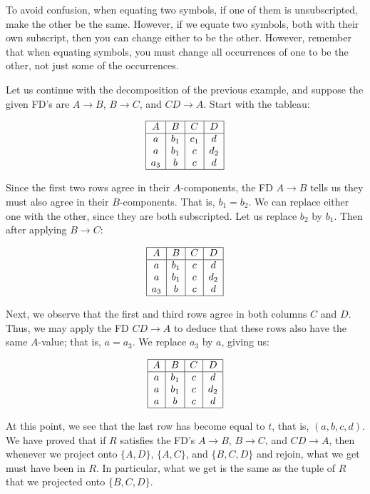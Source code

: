 \documentclass{article}
\begin{document}
    To avoid confusion, when equating two symbols, if one of them is unsubscripted, make the other be the same. However, if we equate two symbols, both with their own subscript, then you can change either to be the other. However, remember that when equating symbols, you must change all occurrences of one to be the other, not just some of the occurrences.

    \begin{example}
      Let us continue with the decomposition of the previous example, and suppose the given FD's are $A \rightarrow B$, $B \rightarrow C$, and $CD \rightarrow A$. Start with the tableau:

      \[
      \begin{array}{|c|c|c|c|}
      \hline
      A & B & C & D \\
      \hline
      a & b_1 & c_1 & d \\
      a & b_1 & c & d_2 \\
      a_3 & b & c & d \\
      \hline
      \end{array}
      \]

      Since the first two rows agree in their $A$-components, the FD $A \rightarrow B$ tells us they must also agree in their $B$-components. That is, $b_1 = b_2$. We can replace either one with the other, since they are both subscripted. Let us replace $b_2$ by $b_1$. Then after applying $B \rightarrow C$:

      \[
      \begin{array}{|c|c|c|c|}
      \hline
      A & B & C & D \\
      \hline
      a & b_1 & c & d \\
      a & b_1 & c & d_2 \\
      a_3 & b & c & d \\
      \hline
      \end{array}
      \]

      Next, we observe that the first and third rows agree in both columns $C$ and $D$. Thus, we may apply the FD $CD \rightarrow A$ to deduce that these rows also have the same $A$-value; that is, $a = a_3$. We replace $a_3$ by $a$, giving us:

      \[
      \begin{array}{|c|c|c|c|}
      \hline
      A & B & C & D \\
      \hline
      a & b_1 & c & d \\
      a & b_1 & c & d_2 \\
      a & b & c & d \\
      \hline
      \end{array}
      \]

      At this point, we see that the last row has become equal to $t$, that is, $(a,b,c,d)$. We have proved that if $R$ satisfies the FD's $A \rightarrow B$, $B \rightarrow C$, and $CD \rightarrow A$, then whenever we project onto $\{A,D\}$, $\{A,C\}$, and $\{B,C,D\}$ and rejoin, what we get must have been in $R$. In particular, what we get is the same as the tuple of $R$ that we projected onto $\{B,C,D\}$.
    \end{example}
\end{document}
